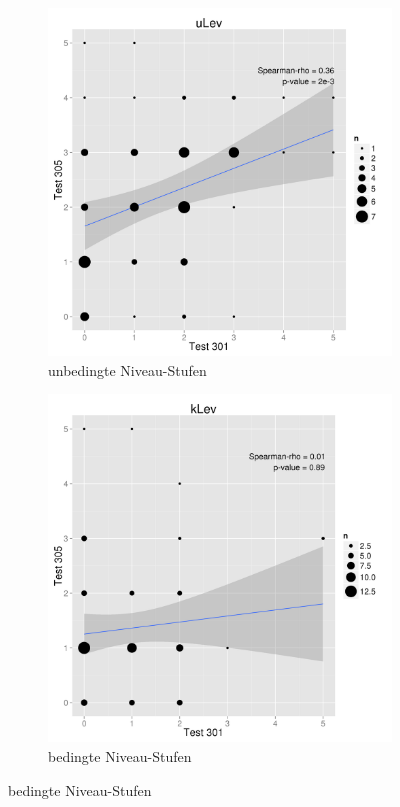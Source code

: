 \begin{figure}[htbp]
\ContinuedFloat %
\centering
\begin{subfigure}{0.49\textwidth}
  \includegraphics[width=1.0\linewidth]{graphics/cor301305u.png}
  \caption{unbedingte Niveau-Stufen}
  \label{fig:cor301305k}
\end{subfigure}
\begin{subfigure}{0.49\textwidth}
  \includegraphics[width=1.0\linewidth]{graphics/cor301305k.png}
  \caption{bedingte Niveau-Stufen}
  \label{fig:cor301305u}
\end{subfigure}


\end{figure}
